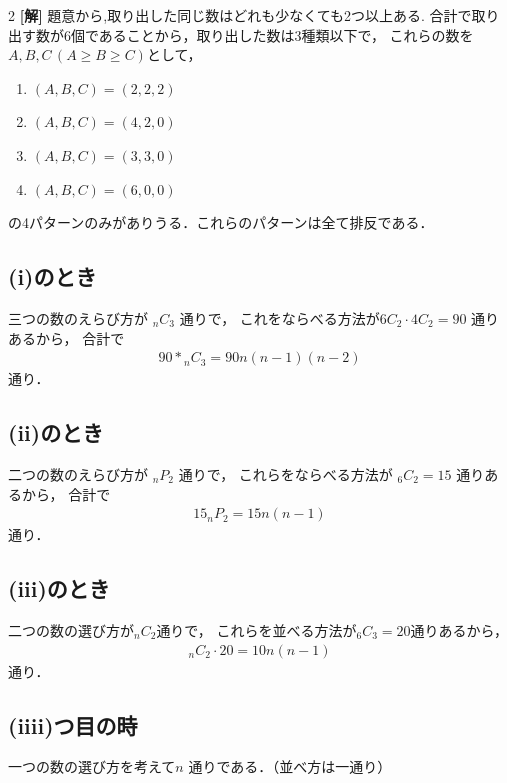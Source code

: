 \documentclass[../../../../main.tex]{subfiles}
\begin{document}
\setcounter{equation}{0}
\begin{oframed}
  
\end{oframed}
\setlength{\columnseprule}{0.4pt}
\begin{multicols}{2}
  {\bf[解]}
  題意から,取り出した同じ数はどれも少なくても2つ以上ある.
  合計で取り出す数が6個であることから，取り出した数は3種類以下で，
  これらの数を$A,B,C\, (A\ge B\ge C)$として，
  \begin{enumerate}
    \item[(i)] $(A,B,C) = (2,2,2)$
    \item[(ii)] $(A,B,C) = (4,2,0)$
    \item[(iii)] $(A,B,C) = (3,3,0)$
    \item[(iiii)] $(A,B,C) = (6,0,0)$
  \end{enumerate}
  の4パターンのみがありうる．これらのパターンは全て排反である．

  \subsection*{(i)のとき}
  三つの数のえらび方が ${}_nC_3$ 通りで，
  これをならべる方法が$6C_2 \cdot 4C_2 = 90$ 通りあるから，
  合計で
  \begin{align*}
    90*{}_nC_{3} = 90n(n-1)(n-2)
  \end{align*}
  通り．

  \subsection*{(ii)のとき}
  二つの数のえらび方が ${}_nP_2$ 通りで，
  これらをならべる方法が ${}_6C_2 = 15$ 通りあるから，
  合計で
  \begin{align*}
    15{}_nP_2 = 15n(n-1)
  \end{align*}
  通り．

  \subsection*{(iii)のとき}
  二つの数の選び方が${}_nC_{2}$通りで，
  これらを並べる方法が${}_6C_{3}=20$通りあるから，
  \begin{align}
    {}_nC_2 \cdot 20 = 10n(n-1)
  \end{align}
  通り．

  \subsection*{(iiii)つ目の時}
  一つの数の選び方を考えて$n$ 通りである．（並べ方は一通り）


\end{multicols}
\end{document}
